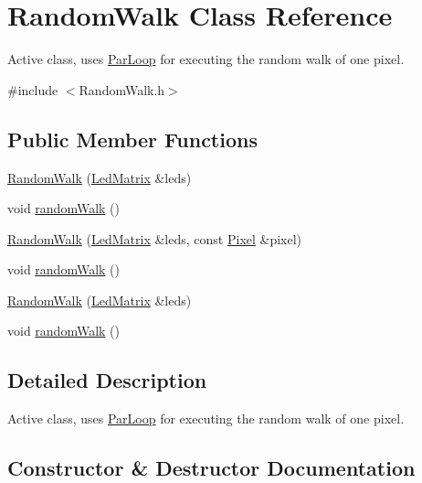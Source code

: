 \hypertarget{class_random_walk}{}\section{Random\+Walk Class Reference}
\label{class_random_walk}


Active class, uses \hyperlink{class_par_loop}{Par\+Loop} for executing the random walk of one pixel.  




{\ttfamily \#include $<$Random\+Walk.\+h$>$}

\subsection*{Public Member Functions}
\begin{DoxyCompactItemize}
\item 
\hyperlink{class_random_walk_aeb88c4057ad738c0d5238ed8278daea9}{Random\+Walk} (\hyperlink{class_led_matrix}{Led\+Matrix} \&leds)
\item 
void \hyperlink{class_random_walk_a90d75ccc484629a8e631c6da39a998b9}{random\+Walk} ()
\item 
\hyperlink{class_random_walk_aadee9e7e81ba62ca6b6aeeeb924484df}{Random\+Walk} (\hyperlink{class_led_matrix}{Led\+Matrix} \&leds, const \hyperlink{class_pixel}{Pixel} \&pixel)
\item 
void \hyperlink{class_random_walk_a90d75ccc484629a8e631c6da39a998b9}{random\+Walk} ()
\item 
\hyperlink{class_random_walk_aeb88c4057ad738c0d5238ed8278daea9}{Random\+Walk} (\hyperlink{class_led_matrix}{Led\+Matrix} \&leds)
\item 
void \hyperlink{class_random_walk_a90d75ccc484629a8e631c6da39a998b9}{random\+Walk} ()
\end{DoxyCompactItemize}


\subsection{Detailed Description}
Active class, uses \hyperlink{class_par_loop}{Par\+Loop} for executing the random walk of one pixel. 

\subsection{Constructor \& Destructor Documentation}

